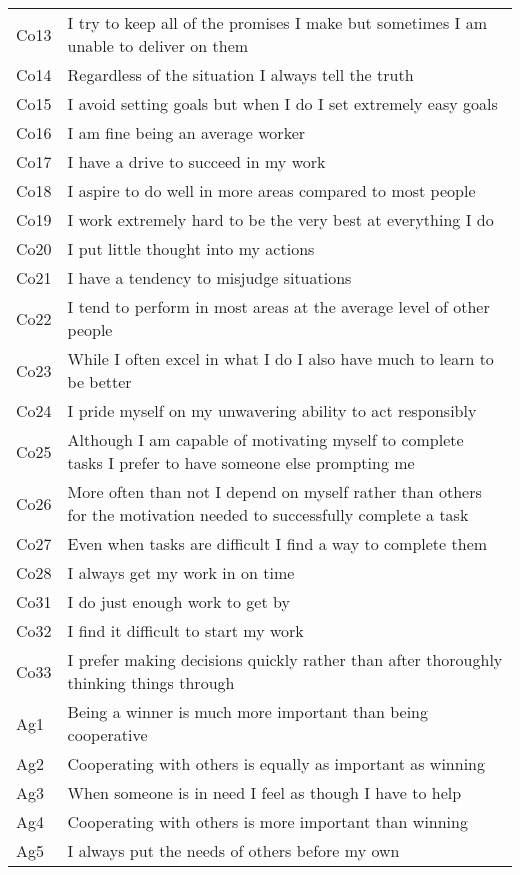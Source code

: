 \documentclass[english,man]{apa6}
\theoremstyle{definition}
\theoremstyle{definition}
\theoremstyle{remark}
\begin{document}
\begin{longtable}{ll}
Co13 & I try to keep all of the promises I make  but sometimes I am unable to deliver on them\\
Co14 & Regardless of the situation  I always tell the truth\\
\addlinespace
Co15 & I avoid setting goals  but when I do  I set extremely easy goals\\
Co16 & I am fine being an average worker\\
Co17 & I have a drive to succeed in my work\\
Co18 & I aspire to do well in more areas compared to most people\\
Co19 & I work extremely hard to be the very best at everything I do\\
\addlinespace
Co20 & I put little thought into my actions\\
Co21 & I have a tendency to misjudge situations\\
Co22 & I tend to perform in most areas at the average level of other people\\
Co23 & While I often excel in what I do  I also have much to learn to be better\\
Co24 & I pride myself on my unwavering ability to act responsibly\\
\addlinespace
Co25 & Although I am capable of motivating myself to complete tasks  I prefer to have someone else prompting me\\
Co26 & More often than not  I depend on myself rather than others for the motivation needed to successfully complete a task\\
Co27 & Even when tasks are difficult  I find a way to complete them\\
Co28 & I always get my work in on time\\
Co31 & I do just enough work to get by\\
\addlinespace
Co32 & I find it difficult to start my work\\
Co33 & I prefer making decisions quickly rather than after thoroughly thinking things through\\
Ag1 & Being a winner is much more important than being cooperative\\
Ag2 & Cooperating with others is equally as important as winning\\
Ag3 & When someone is in need  I feel as though I have to help\\
\addlinespace
Ag4 & Cooperating with others is more important than winning\\
Ag5 & I always put the needs of others before my own\\

\end{longtable}
\end{document}
